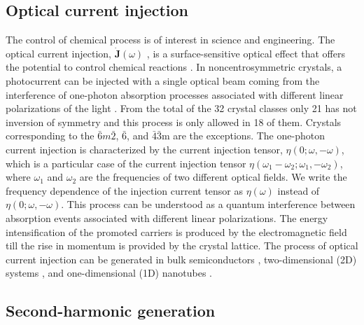 \documentclass[pss]{wiley2sp} %
\begin{document}
\subsection{Optical current injection}

The control of chemical process is of interest in science and engineering. The optical current injection, $\mathbf{\dot{J}}(\omega)$ , is a surface-sensitive optical effect that offers the potential to control chemical reactions \cite{bhatPRB05,hachePRL97}. In noncentrosymmetric crystals, a photocurrent can be injected with a single optical beam coming  from the interference of one-photon absorption processes associated with different linear polarizations of the light \cite{sipePRB00}. From the total of the 32 crystal classes only 21 has not inversion of symmetry and this process is only allowed in 18 of them. Crystals corresponding to the $\bar{6}m\bar{2}$, $\bar{6}$, and $\bar{4}$$\bar{3}$m are the exceptions. The one-photon current injection is characterized by the current injection tensor, $\eta(0; \omega, − \omega)$, which is a particular case of the current injection tensor $\eta(\omega_{1}-\omega_{2}; \omega_{1},-\omega_{2})$, where $\omega_{1}$ and $\omega_{2}$ are the frequencies of two different optical fields. We write the frequency dependence of the injection current tensor as $\eta(\omega)$ instead of $\eta(0; \omega, − \omega)$. This process can be understood as a quantum interference between absorption events associated with different linear polarizations. The energy intensification of the promoted carriers is produced by the electromagnetic field till the rise in momentum is provided by the crystal lattice. The process of optical current injection can be generated in bulk semiconductors \cite{hachePRL97,sipePRB00}, two-dimensional (2D) systems \cite{melePRB00,cabellosPRB11}, and one-dimensional (1D) nanotubes \cite{melePRB00}. 

\subsection{Second-harmonic generation}
\end{document}
